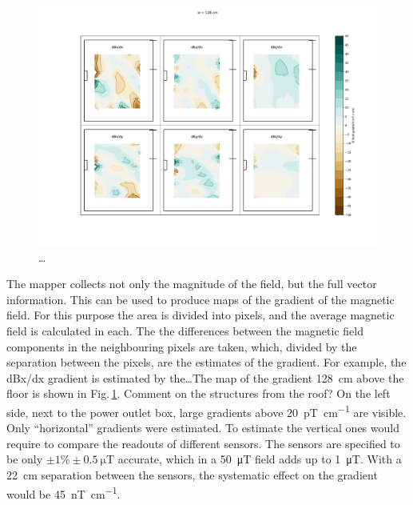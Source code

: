 \begin{figure}
  \centering
  \includegraphics[width=\linewidth]{gfx/mapping/lpsc/bastille_crane_away_rep_gradient_139cm.pdf}
  \caption{\ldots}\label{fig:mapping_bastille_gradient}
\end{figure}

The mapper collects not only the magnitude of the field, but the full vector information. This can be used to produce maps of the gradient of the magnetic field. For this purpose the area is divided into pixels, and the average magnetic field is calculated in each.
The the differences between the magnetic field components in the neighbouring pixels are taken, which, divided by the separation between the pixels, are the estimates of the gradient.
For example, the dBx/dx gradient is estimated by the\ldots The map of the gradient \SI{128}{\centi\meter} above the floor is shown in Fig.\,\ref{fig:mapping_bastille_gradient}. Comment on the structures from the roof? On the left side, next to the power outlet box, large gradients above \SI[per-mode=symbol]{20}{\pico\tesla\per\centi\meter} are visible. Only ``horizontal'' gradients were estimated.
To estimate the vertical ones would require to compare the readouts of different sensors. The sensors are specified to be only $\pm 1\% \pm \SI{0.5}{\micro\tesla}$ accurate, which in a \SI{50}{\micro\tesla} field adds up to \SI{1}{\micro\tesla}. With a \SI{22}{\centi\meter} separation between the sensors, the systematic effect on the gradient would be \SI[per-mode=symbol]{45}{\nano\tesla\per\centi\meter}.

